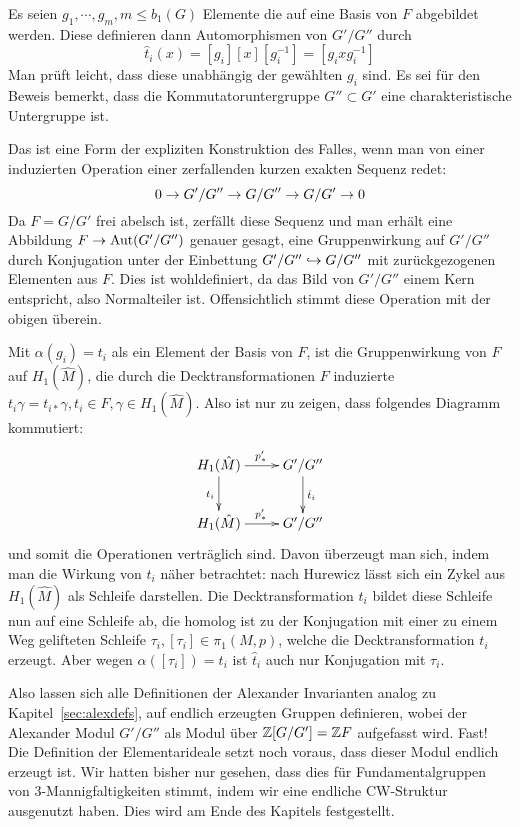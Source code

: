 Es seien $g_1,\cdots,g_m,m\leq b_1(G)$ Elemente die auf eine Basis von $F$ abgebildet werden. Diese definieren dann Automorphismen von $G'/G''$ durch 
\[
	\hat t_i(x) =  [g_i]  [x][ g_i^{-1}] = [ g_i x g_i^{-1}]
\]
Man prüft leicht, dass diese unabhängig der gewählten $g_i$ sind. Es sei für den Beweis bemerkt, dass die Kommutatoruntergruppe $G''\subset G'$ eine charakteristische Untergruppe ist. 
\begin{bem}
 	Das ist eine Form der expliziten Konstruktion des Falles, wenn man von einer induzierten Operation einer zerfallenden kurzen exakten Sequenz redet:
 	\[
 		0\to G'/G''\to G/G''\to G/G'\to0
 	\]
 	Da $F= G/G'$ frei abelsch ist, zerfällt diese Sequenz und man erhält eine Abbildung $F \to \operatorname{Aut}(G'/G'')$ genauer gesagt, eine Gruppenwirkung auf $G'/G''$ durch Konjugation unter der Einbettung $G'/G''\hookrightarrow G/G''$ mit zurückgezogenen Elementen aus $F$. Dies ist wohldefiniert, da das Bild von $G'/G''$ einem Kern entspricht, also Normalteiler ist. Offensichtlich stimmt diese Operation mit der obigen überein.
 \end{bem} 
 
 Mit $\alpha(g_i)=t_i$ als ein Element der Basis von $F$, ist die Gruppenwirkung von $F$ auf $H_1(\hat M)$, die durch die Decktransformationen $F$ induzierte $t_i\gamma = t_{i*}\gamma,t_i \in F , \gamma \in H_1(\hat M)$. Also ist nur zu zeigen, dass folgendes Diagramm kommutiert:
\[
	\begin{xy}
		\xymatrix{H_1(\hat M) \ar[d]_{t_i} \ar[r]^{p'_*} & G'/G'' \ar[d]^{\hat t_i}\\
		H_1(\hat M)  \ar[r]^{p'_*} & G'/G'' }
	\end{xy}
\]
und somit die Operationen verträglich sind. Davon überzeugt man sich, indem man die Wirkung von $t_i$ näher betrachtet: nach Hurewicz lässt sich ein Zykel aus $H_1(\hat M)$ als Schleife darstellen. Die Decktransformation $t_i$ bildet diese Schleife nun auf eine Schleife ab, die homolog ist zu der Konjugation mit einer zu einem Weg gelifteten Schleife $\tau_i, [\tau_i] \in \pi_1(M,p)$, welche die Decktransformation $t_i$ erzeugt. Aber wegen $\alpha([\tau_i])=t_i$ ist $\hat t_i$ auch nur Konjugation mit $\tau_i$.

Also lassen sich alle Definitionen der Alexander Invarianten analog zu Kapitel~\ref{sec:alexdefs}, auf endlich erzeugten Gruppen definieren, wobei der Alexander Modul $G'/G''$ als Modul über $\mathbb{Z} [G/G']= \mathbb{Z} F$ aufgefasst wird. Fast! Die Definition der Elementarideale setzt noch voraus, dass dieser Modul endlich erzeugt ist. Wir hatten bisher nur gesehen, dass dies für Fundamentalgruppen von 3-Mannigfaltigkeiten stimmt, indem wir eine endliche CW-Struktur ausgenutzt haben. Dies wird am Ende des Kapitels festgestellt.

